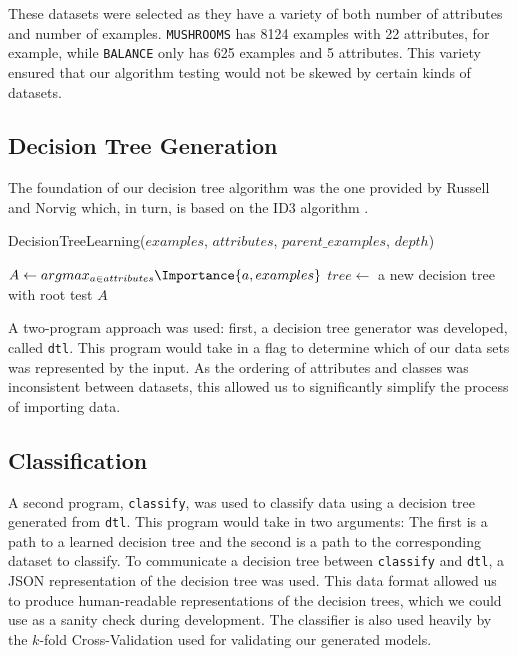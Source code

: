 \documentclass[screen, authorversion, nonacm, sigconf]{acmart}
\begin{document}
These datasets were selected as they have a variety of both number of attributes and number of examples. \texttt{MUSHROOMS} has 8124 examples with 22 attributes, for example, while \texttt{BALANCE} only has 625 examples and 5 attributes. This variety ensured that our algorithm testing would not be skewed by certain kinds of datasets.

\subsection{Decision Tree Generation}

The foundation of our decision tree algorithm was the one provided by Russell and Norvig \cite{russell_norvig_2010} which, in turn, is based on the ID3 algorithm \cite{Quinlan1986}.

\begin{function}
	\SetAlgoLined
  \caption{DecisionTreeLearning($examples$, $attributes$, $parent\_examples$, $depth$)}
  \label{algo:DecisionTreeLearning}
  $A \gets argmax_{a \in attributes} \Importance{a, examples}$\;
  $tree \gets$ a new decision tree with root test $A$\;
  \;
\end{function}

A two-program approach was used: first, a decision tree generator was developed, called \texttt{dtl}. This program would take in a flag to determine which of our data sets was represented by the input. As the ordering of attributes and classes was inconsistent between datasets, this allowed us to significantly simplify the process of importing data.

\subsection{Classification}

A second program, \texttt{classify}, was used to classify data using a decision tree generated from \texttt{dtl}. This program would take in two arguments: The first is a path to a learned decision tree and the second is a path to the corresponding dataset to classify. To communicate a decision tree between \texttt{classify} and \texttt{dtl}, a JSON representation of the decision tree was used. This data format allowed us to produce human-readable representations of the decision trees, which we could use as a sanity check during development. The classifier is also used heavily by the $k$-fold Cross-Validation used for validating our generated models.
\end{document}
